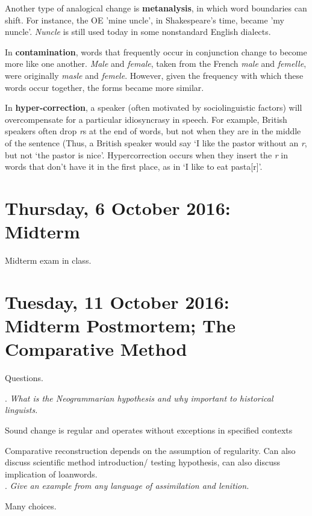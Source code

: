 \documentclass{exam}
\begin{document}
Another type of analogical change is \textbf{metanalysis}, in which word boundaries can shift. For instance, the OE 'mine uncle', in Shakespeare's time, became 'my nuncle'. \textit{Nuncle} is still used today in some nonstandard English dialects. 

In \textbf{contamination}, words that frequently occur in conjunction change to become more like one another. \textit{Male} and \textit{female}, taken from the French \textit{male} and \textit{femelle}, were originally \textit{masle} and \textit{femele}. However, given the frequency with which these words occur together, the forms became more similar. 

In \textbf{hyper-correction}, a speaker (often motivated by sociolinguistic factors) will overcompensate for a particular idiosyncrasy in speech. For example, British speakers often drop \textit{r}s at the end of words, but not when they are in the middle of the sentence (Thus, a British speaker would say `I like the pastor without an \textit{r}, but not `the pastor is nice'. Hypercorrection occurs when they insert the \textit{r} in words that don't have it in the first place, as in `I like to eat pasta[r]'.

\section*{Thursday, 6 October 2016: Midterm}

Midterm exam in class.

\section*{Tuesday, 11 October 2016: Midterm Postmortem; The Comparative Method}


Questions.

. \textit{What is the Neogrammarian hypothesis and why important to historical linguists.} 

\noindent Sound change is regular and operates without exceptions in specified contexts 

\noindent Comparative reconstruction depends on the assumption of regularity. Can also discuss scientific method introduction/ testing hypothesis, can also discuss implication of loanwords. \\

. \textit{Give an example from any language of assimilation and lenition.}

\noindent Many choices.\\
\end{document}
